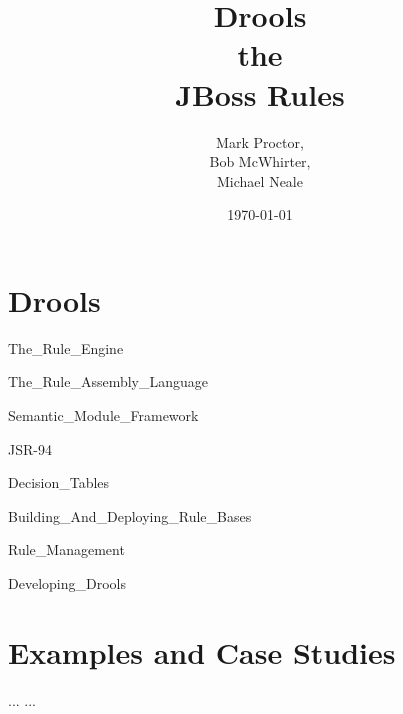 \documentclass[14pt]{book}
\begin{document}
\title{\Huge\bf Drools\\ the\\ JBoss Rules}
\author{Mark Proctor,\\ 
       Bob McWhirter,\\ 
       Michael Neale}
\date{\today}
\maketitle

\tableofcontents

\part {Drools}

 {The_Rule_Engine}

 {The_Rule_Assembly_Language}

 {Semantic_Module_Framework}

 {JSR-94}

 {Decision_Tables}

 {Building_And_Deploying_Rule_Bases}

 {Rule_Management}

 {Developing_Drools}

\part {Examples and Case Studies}

\begin{thebibliography}{99}
 ...
 ...
\end{thebibliography}

\printindex
\end{document}
